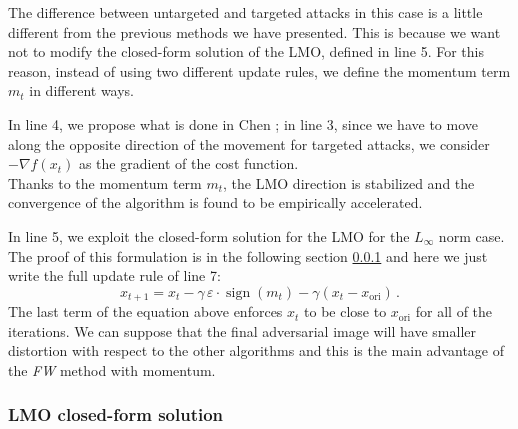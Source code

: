 \documentclass[10pt,twocolumn,letterpaper, english]{article}
\newcommand{\sign}{\mathop{\mathrm{sign}}}
\theoremstyle{definition}
\theoremstyle{plain}
\theoremstyle{plain}
\theoremstyle{plain}
\theoremstyle{plain}
\theoremstyle{remark}
\theoremstyle{remark}
\theoremstyle{definition}
\theoremstyle{definition}
\theoremstyle{definition}
\theoremstyle{definition}
\renewcommand{\epsilon}{\varepsilon}
\begin{document}
The difference between untargeted and targeted attacks in this case is a little different from the previous methods we have presented. 
This is because we want not to modify the closed-form solution of the LMO, defined in line 5. 
For this reason, instead of using two different update rules, we define the momentum term $m_t$ in different ways. 

In line 4, we propose what is done in Chen \cite{frank}; in line 3, since we have to move along the opposite direction of the movement for targeted attacks, we consider $- \nabla f(x_t)$ as the gradient of the cost function. \\

Thanks to the momentum term $m_t$, the LMO direction is stabilized and the convergence of the algorithm is found to be empirically accelerated. 

In line 5, we exploit the closed-form solution for the LMO for the $L_\infty$ norm case. 
The proof of this formulation is in the following section \ref{LMO} and here we just write the full update rule of line 7:
\begin{equation*}
    x_{t+1} = x_t - \gamma \, \epsilon \cdot \sign(m_t) - \gamma (x_t - x_{\text{ori}}) \,.
\end{equation*}
The last term of the equation above enforces $x_t$ to be close to $x_{\text{ori}}$ for all of the iterations. 
We can suppose that the final adversarial image will have smaller distortion with respect to the other algorithms and this is the main advantage of the \textit{FW} method with momentum. 

\subsubsection{LMO closed-form solution} \label{LMO}
\end{document}
